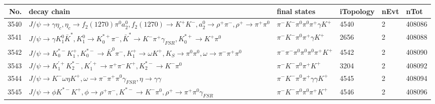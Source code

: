 \begin{table}[htbp] 
\begin{center}
\begin{small}
\begin{tabular}{rlllll}\hline\hline
 No. & decay chain & final states &  iTopology & nEvt & nTot \\\hline
3540&$J/\psi       \rightarrow \gamma       \eta_{c}    , \eta_{c}     \rightarrow f_{2}(1270)    \pi^{0}        a_{2}^{0}      , f_{2}(1270)     \rightarrow K^{+}          K^{-}          , a_{2}^{0}       \rightarrow \rho^{+}      \pi^{-}        , \rho^{+}       \rightarrow \pi^{+}        \pi^{0}        $&$\pi^{-}        K^{-}          \pi^{0}        \pi^{0}        \pi^{+}        \gamma       K^{+}          $& 4540&    2&408086\\
3541&$J/\psi       \rightarrow \gamma       K_1^{0}        \bar{K}^{*}   , K_1^{0}         \rightarrow K_{0}^{*+}     \pi^{-}        , \bar{K}^{*}    \rightarrow K^{-}          \pi^{+}        \gamma_{FSR} , K_{0}^{*+}      \rightarrow K^{+}          \pi^{0}        $&$\pi^{-}        K^{-}          \pi^{0}        \pi^{+}        \gamma       K^{+}          $& 2656&    2&408088\\
3542&$J/\psi       \rightarrow K_{0}^{*-}     K_1^{+}        , K_{0}^{*-}      \rightarrow \bar{K}^{0}   \pi^{-}        , K_1^{+}         \rightarrow \omega         K^{+}          , K_{S}           \rightarrow \pi^{0}        \pi^{0}        , \omega          \rightarrow \pi^{-}        \pi^{+}        \pi^{0}        $&$\pi^{-}        \pi^{-}        \pi^{0}        \pi^{0}        \pi^{0}        \pi^{+}        K^{+}          $& 4542&    2&408090\\
3543&$J/\psi       \rightarrow K_1^{'+}      K_2^{*-}       , K_1^{'+}       \rightarrow \pi^{+}        \pi^{-}        K^{+}          , K_2^{*-}        \rightarrow K^{-}          \pi^{0}        $&$\pi^{-}        K^{-}          \pi^{0}        \pi^{+}        K^{+}          $& 3204&    2&408092\\
3544&$J/\psi       \rightarrow K^{-}          \omega         \eta          K^{+}          , \omega          \rightarrow \pi^{-}        \pi^{+}        \pi^{0}        \gamma_{FSR} , \eta           \rightarrow \gamma       \gamma       $&$\pi^{-}        K^{-}          \pi^{0}        \pi^{+}        \gamma       \gamma       K^{+}          $& 4545&    2&408094\\
3545&$J/\psi       \rightarrow \phi           K^{*-}         K^{+}          , \phi            \rightarrow \rho^{+}      \pi^{-}        , K^{*-}          \rightarrow K^{-}          \pi^{0}        , \rho^{+}       \rightarrow \pi^{+}        \pi^{0}        \gamma_{FSR} $&$\pi^{-}        K^{-}          \pi^{0}        \pi^{0}        \pi^{+}        K^{+}          $& 4546&    2&408096\\

\end{tabular}
\end{small}
\end{center}
\end{table}
